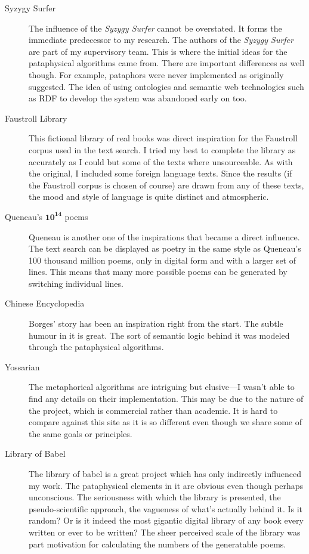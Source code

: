 \begin{description}
  \item[Syzygy Surfer] The influence of the \textit{Syzygy Surfer} cannot be overstated. It forms the immediate predecessor to my research. The authors of the \textit{Syzygy Surfer} are part of my supervisory team. This is where the initial ideas for the pataphysical algorithms came from. There are important differences as well though. For example, pataphors were never implemented as originally suggested. The idea of using ontologies and semantic web technologies such as \ac{RDF} to develop the system was abandoned early on too.
  \item[Faustroll Library] This fictional library of real books was direct inspiration for the Faustroll corpus used in the text search. I tried my best to complete the library as accurately as I could but some of the texts where unsourceable. As with the original, I included some foreign language texts. Since the results (if the Faustroll corpus is chosen of course) are drawn from any of these texts, the mood and style of language is quite distinct and atmospheric.
  \item[Queneau's $\bm{10^{14}}$ poems] Queneau is another one of the inspirations that became a direct influence. The text search can be displayed as poetry in the same style as Queneau's 100 thousand million poems, only in digital form and with a larger set of lines. This means that many more possible poems can be generated by switching individual lines.
  \item[Chinese Encyclopedia] Borges' story has been an inspiration right from the start. The subtle humour in it is great. The sort of semantic logic behind it was modeled through the pataphysical algorithms.
  \item[Yossarian] The metaphorical algorithms are intriguing but elusive---I wasn't able to find any details on their implementation. This may be due to the nature of the project, which is commercial rather than academic. It is hard to compare against this site as it is so different even though we share some of the same goals or principles.
  \item[Library of Babel] The library of babel is a great project which has only indirectly influenced my work. The pataphysical elements in it are obvious even though perhaps unconscious. The seriousness with which the library is presented, the pseudo-scientific approach, the vagueness of what's actually behind it. Is it random? Or is it indeed the most gigantic digital library of any book every written or ever to be written? The sheer perceived scale of the library was part motivation for calculating the numbers of the generatable poems.

\end{description}
